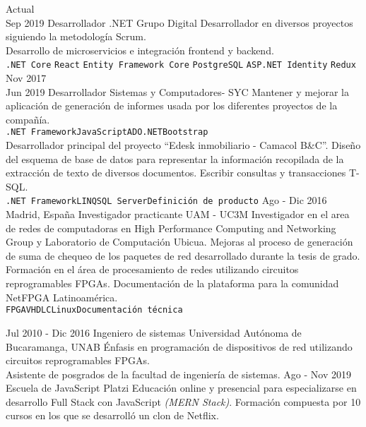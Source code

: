 \documentclass[9pt]{developercv}
\begin{document}
	\begin{entrylist}
		\entry
		{Actual\\Sep 2019}
		{Desarrollador .NET}
		{Grupo Digital}
		{
			Desarrollador en diversos proyectos siguiendo la metodología Scrum.\\
			Desarrollo de microservicios e integración frontend y backend.\\
			\texttt{.NET Core}\slashsep
			\texttt{React}\slashsep
			\texttt{Entity Framework Core}\slashsep
			\texttt{PostgreSQL}\slashsep
			\texttt{ASP.NET Identity}\slashsep
			\texttt{Redux}
		}
		\entry
		{Nov 2017\\Jun 2019}
		{Desarrollador}
		{Sistemas y Computadores- SYC}
		{
			Mantener y mejorar la aplicación de generación de informes usada por los diferentes proyectos de la compañía.\\
			\texttt{.NET Framework\slashsep JavaScript\slashsep ADO.NET\slashsep Bootstrap}\\
			Desarrollador principal del proyecto “Edesk inmobiliario - Camacol B\&C”. Diseño del esquema de base de datos para representar la información recopilada de la extracción de texto de diversos documentos. Escribir consultas y transacciones T-SQL.\\
			\texttt{.NET Framework\slashsep LINQ\slashsep SQL Server\slashsep Definición de producto}
		}
		\entry
		{Ago - Dic 2016\\Madrid, España}
		{Investigador practicante}
		{UAM - UC3M}
		{
			Investigador en el area de redes de computadoras en High Performance Computing and Networking Group y Laboratorio de Computación Ubicua.
			Mejoras al proceso de generación de suma de chequeo de los paquetes de red desarrollado durante la tesis de grado.
			Formación en el área de procesamiento de redes utilizando circuitos reprogramables FPGAs.
			Documentación de la plataforma para la comunidad NetFPGA Latinoamérica.\\
			\texttt{FPGA\slashsep VHDL\slashsep C\slashsep Linux\slashsep Documentación técnica}                
		}
	\end{entrylist}
	\vspace{-\baselineskip}
	
	\cvsect{Educación}
	\begin{entrylist}
		\entry
		{Jul 2010 - Dic 2016}
		{Ingeniero de sistemas}
		{Universidad Autónoma de Bucaramanga, UNAB}
		{	Énfasis en programación de dispositivos de red utilizando circuitos reprogramables FPGAs.\\
			Asistente de posgrados de la facultad de ingeniería de sistemas.
		}
		\entry
		{Ago - Nov 2019}
		{Escuela de JavaScript}
		{Platzi}
		{Educación online y presencial para especializarse en desarrollo Full Stack con JavaScript \textit{(MERN Stack)}. Formación compuesta por 10 cursos en los que se desarrolló un clon de Netflix.}		
	\end{entrylist}
	\vspace{-\baselineskip}
	
\end{document}
